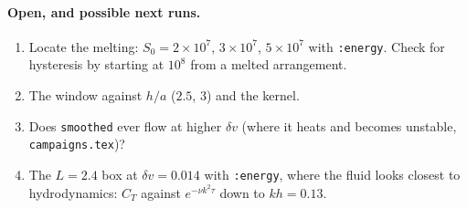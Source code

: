 \documentclass[11pt,aps,preprint,nofootinbib,superscriptaddress,tightenlines]{revtex4-2}
\let\oldparagraph\paragraph
\renewcommand{\paragraph}{\par\bigskip\oldparagraph}
\begin{document}
\paragraph{Open, and possible next runs.}
\begin{enumerate}
\item Locate the melting: $S_0=2\times10^7$, $3\times10^7$, $5\times10^7$ with \texttt{:energy}.
  Check for hysteresis by starting at $10^8$ from a melted arrangement.
\item The window against $h/a$ ($2.5$, $3$) and the kernel.
\item Does \texttt{smoothed} ever flow at higher $\delta v$ (where it heats and becomes unstable,
  \texttt{campaigns.tex})?
\item The $L=2.4$ box at $\delta v=0.014$ with \texttt{:energy}, where the fluid looks closest to
  hydrodynamics: $C_T$ against $e^{-\nu k^2\tau}$ down to $kh=0.13$.
\end{enumerate}
\end{document}
